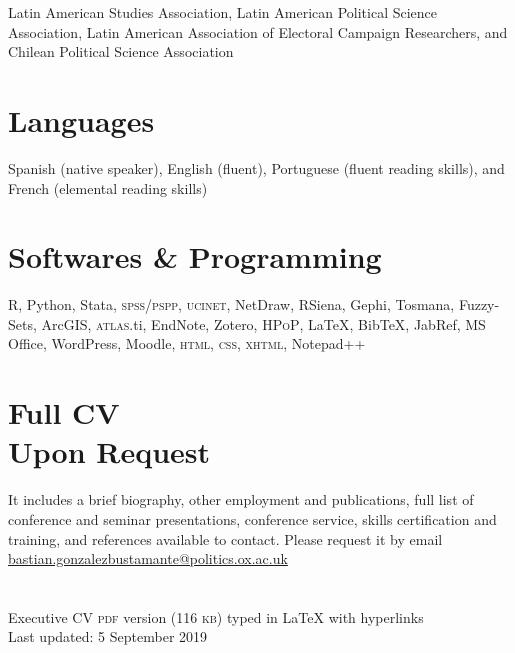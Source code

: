 \documentclass[letterpaper,margin]{res}
\begin{document}
\begin{resume}
{\small Latin American Studies Association, Latin American Political Science Association, Latin American Association of Electoral Campaign Researchers, and Chilean Political Science Association}



\section{\footnotesize Languages}

{\small Spanish (native speaker), English (fluent), Portuguese (fluent reading skills), and French (elemental reading skills)}


\section{\footnotesize Softwares \& Programming}

{\small R, Python, Stata, {\scshape spss/pspp}, {\scshape ucinet}, NetDraw, RSiena, Gephi, Tosmana, Fuzzy-Sets, ArcGIS, {\scshape atlas}.ti, EndNote, Zotero, {\scshape HPoP}, {\LaTeX}, Bib{\TeX}, JabRef, MS Office, WordPress, Moodle, {\scshape html}, {\scshape css}, {\scshape xhtml}, Notepad{\footnotesize ++}}


\section{\footnotesize Full CV \\ Upon Request}

{\small It includes a brief biography, other employment and publications, full list of conference and seminar presentations, conference service, skills certification and training, and references available to contact. Please request it by email {\large \Letter} \href{mailto:bastian.gonzalezbustamante@politics.ox.ac.uk}{bastian.gonzalezbustamante@politics.ox.ac.uk}}\\

\section{}
{\footnotesize Executive CV {\scshape pdf} version (116 {\scshape kb}) typed in {\small {\LaTeX}} with hyperlinks}\\
{\footnotesize Last updated: 5 September 2019}\\

\end{resume} 
\end{document}

